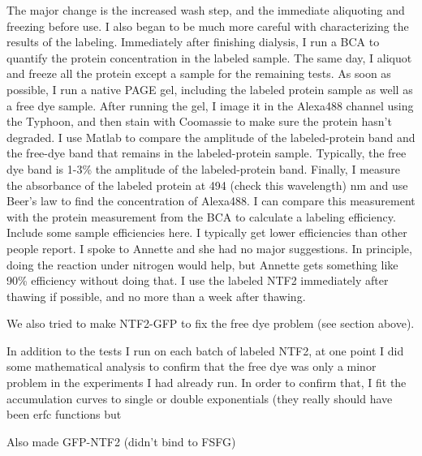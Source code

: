 The major change is the increased wash step, and the immediate aliquoting and freezing before use.  I also began to be much more careful with characterizing the results of the labeling.  Immediately after finishing dialysis, I run a BCA to quantify the protein concentration in the labeled sample.  The same day, I aliquot and freeze all the protein except a sample for the remaining tests.  As soon as possible, I run a native PAGE gel, including the labeled protein sample as well as a free dye sample.  After running the gel, I image it in the Alexa488 channel using the Typhoon, and then stain with Coomassie to make sure the protein hasn't degraded.  I use Matlab to compare the amplitude of the labeled-protein band and the free-dye band that remains in the labeled-protein sample.  Typically, the free dye band is 1-3\% the amplitude of the labeled-protein band.  Finally, I measure the absorbance of the labeled protein at 494 (check this wavelength) nm and use Beer's law to find the concentration of Alexa488.  I can compare this measurement with the protein measurement from the BCA to calculate a labeling efficiency.  Include some sample efficiencies here.  I typically get lower efficiencies than other people report.  I spoke to Annette and she had no major suggestions.  In principle, doing the reaction under nitrogen would help, but Annette gets something like 90\% efficiency without doing that.  I use the labeled NTF2 immediately after thawing if possible, and no more than a week after thawing.

We also tried to make NTF2-GFP to fix the free dye problem (see section above).

In addition to the tests I run on each batch of labeled NTF2, at one point I did some mathematical analysis to confirm that the free dye was only a minor problem in the experiments I had already run.  In order to confirm that, I fit the accumulation curves to single or double exponentials (they really should have been erfc functions but 


Also made GFP-NTF2 (didn’t bind to FSFG)
